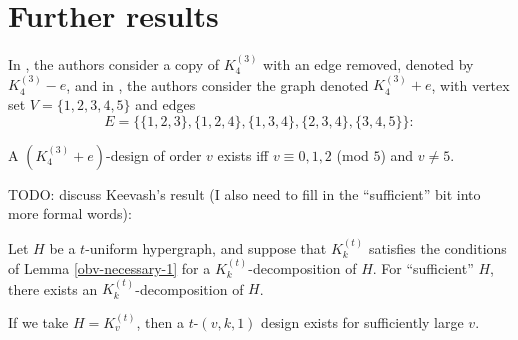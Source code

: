 \section{Further results}

In \cite{feng-chang2}, the authors consider a copy of $K_4^{(3)}$ with an edge removed, denoted by $K_4^{(3)} - e$, and in \cite{feng-chang}, the authors consider the graph denoted $K_4^{(3)} + e$, with vertex set $V = \{1,2,3,4,5\}$ and edges \[E = \{\{1,2,3\},\{1,2,4\},\{1,3,4\},\{2,3,4\},\{3,4,5\}\}:\]

\begin{theorem}
A $(K_4^{(3)}+e)$-design of order $v$ exists iff $v \equiv 0,1,2$ (mod $5$) and $v \neq 5$.
\end{theorem}

\vspace{0.5cm}
TODO: discuss Keevash's result (I also need to fill in the ``sufficient'' bit into more
formal words):
\vspace{0.5cm}

\begin{theorem}
Let $H$ be a $t$-uniform hypergraph, and suppose that $K_{k}^{(t)}$ satisfies
the conditions of Lemma \ref{obv-necessary-1} for a $K_{k}^{(t)}$-decomposition
of $H$. For ``sufficient'' $H$, there exists an $K_{k}^{(t)}$-decomposition of $H$.
\end{theorem}

If we take $H = K_{v}^{(t)}$, then a $t$-$(v, k, 1)$ design exists for sufficiently large $v$.
